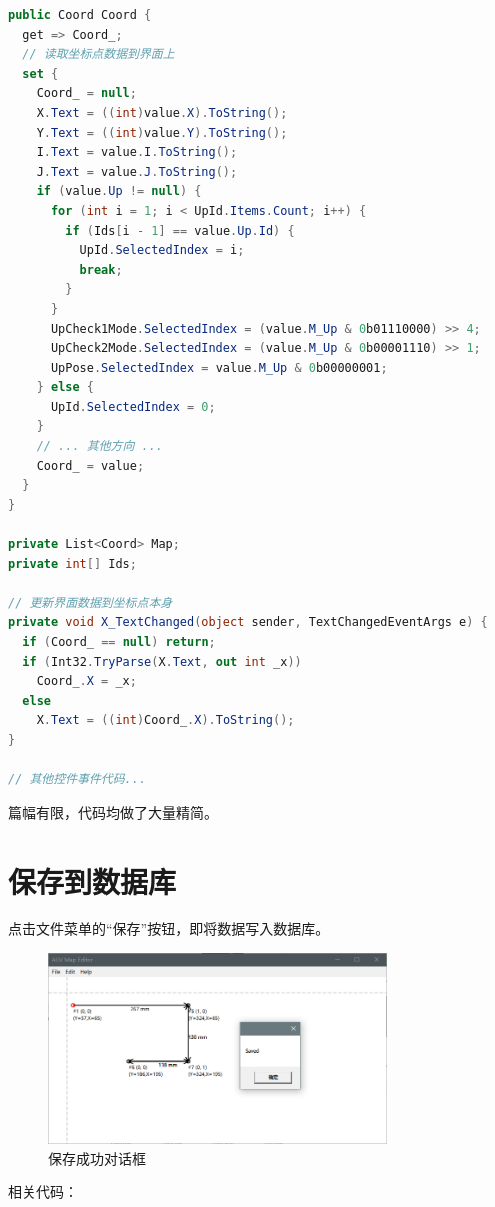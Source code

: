 \begin{lstlisting}[language=cs]
public Coord Coord {
  get => Coord_;
  // 读取坐标点数据到界面上
  set {
    Coord_ = null;
    X.Text = ((int)value.X).ToString();
    Y.Text = ((int)value.Y).ToString();
    I.Text = value.I.ToString();
    J.Text = value.J.ToString();
    if (value.Up != null) {
      for (int i = 1; i < UpId.Items.Count; i++) {
        if (Ids[i - 1] == value.Up.Id) {
          UpId.SelectedIndex = i;
          break;
        }
      }
      UpCheck1Mode.SelectedIndex = (value.M_Up & 0b01110000) >> 4;
      UpCheck2Mode.SelectedIndex = (value.M_Up & 0b00001110) >> 1;
      UpPose.SelectedIndex = value.M_Up & 0b00000001;
    } else {
      UpId.SelectedIndex = 0;
    }
    // ... 其他方向 ...
    Coord_ = value;
  }
}

private List<Coord> Map;
private int[] Ids;

// 更新界面数据到坐标点本身
private void X_TextChanged(object sender, TextChangedEventArgs e) {
  if (Coord_ == null) return;
  if (Int32.TryParse(X.Text, out int _x))
    Coord_.X = _x;
  else
    X.Text = ((int)Coord_.X).ToString();
}

// 其他控件事件代码...
\end{lstlisting}

篇幅有限，代码均做了大量精简。

\section{保存到数据库}

点击文件菜单的``保存''按钮，即将数据写入数据库。

\begin{figure}[H]
  \centering
  \includegraphics[width=0.8\textwidth]{assets/save.png}
  \caption{保存成功对话框}
  \label{fig:save}
\end{figure}

相关代码：

